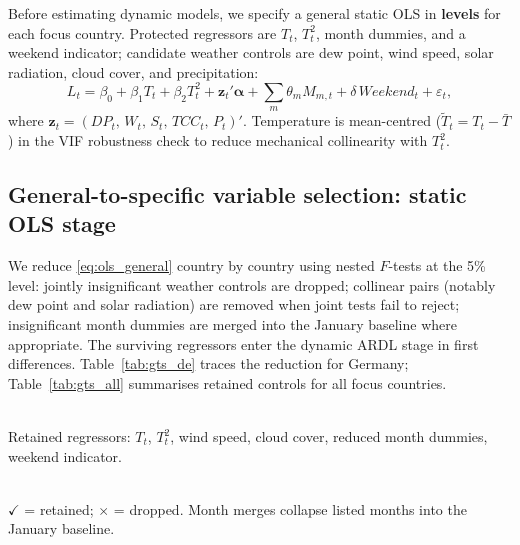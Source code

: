 \documentclass[12pt,a4paper]{article}
\begin{document}
Before estimating dynamic models, we specify a general static OLS in \textbf{levels} for each focus country. Protected regressors are $T_t$, $T_t^2$, month dummies, and a weekend indicator; candidate weather controls are dew point, wind speed, solar radiation, cloud cover, and precipitation:
\begin{equation}
  L_t = \beta_0 + \beta_1 T_t + \beta_2 T_t^2
        + \mathbf{z}_t'\boldsymbol{\alpha}
        + \sum_m \theta_m M_{m,t}
        + \delta\,\mathit{Weekend}_t
        + \varepsilon_t,
  \label{eq:ols_general}
\end{equation}
where $\mathbf{z}_t = (\mathit{DP}_t,\, W_t,\, S_t,\, \mathit{TCC}_t,\, P_t)'$.
Temperature is mean-centred ($\tilde{T}_t = T_t - \bar{T}$) in the VIF robustness check to reduce mechanical collinearity with $T_t^2$.

\subsection{General-to-specific variable selection: static OLS stage}
\label{sec:gts}

We reduce \eqref{eq:ols_general} country by country using nested $F$-tests at the 5\% level: jointly insignificant weather controls are dropped; collinear pairs (notably dew point and solar radiation) are removed when joint tests fail to reject; insignificant month dummies are merged into the January baseline where appropriate. The surviving regressors enter the dynamic ARDL stage in first differences. Table~\ref{tab:gts_de} traces the reduction for Germany; Table~\ref{tab:gts_all} summarises retained controls for all focus countries.

\begin{table}[H]
  \centering
  \caption{General-to-specific OLS reduction --- Germany}
  \label{tab:gts_de}
  \small
  
  \\[0.5em]
  \footnotesize Retained regressors: $T_t$, $T_t^2$, wind speed, cloud cover,
  reduced month dummies, weekend indicator.
\end{table}

\begin{table}[H]
  \centering
  \caption{Surviving weather controls by country after GTS reduction}
  \label{tab:gts_all}
  \small
  
  \\[0.5em]
  \footnotesize $\checkmark$ = retained; $\times$ = dropped. Month merges collapse listed months into the January baseline.
\end{table}
\end{document}
